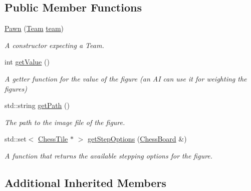 \subsection*{Public Member Functions}
\begin{DoxyCompactItemize}
\item 
\mbox{\label{classPawn_ab800634302e5af17a3d37cfe23f4cf15}} 
\mbox{\hyperlink{classPawn_ab800634302e5af17a3d37cfe23f4cf15}{Pawn}} (\mbox{\hyperlink{classChessFigure_a62f54318c1f28a08e6a6a2707f697a1d}{Team}} \mbox{\hyperlink{classChessFigure_ac7d0751a28c94d49927b9524390d1261}{team}})
\begin{DoxyCompactList}\small\item\em A constructor expecting a Team. \end{DoxyCompactList}\item 
\mbox{\label{classPawn_ab8d4325ff14660b70455c7b7acee221c}} 
int \mbox{\hyperlink{classPawn_ab8d4325ff14660b70455c7b7acee221c}{get\+Value}} ()
\begin{DoxyCompactList}\small\item\em A getter function for the value of the figure (an AI can use it for weighting the figures) \end{DoxyCompactList}\item 
\mbox{\label{classPawn_a72fd4d337ecea0e41f2ffb1933643269}} 
std\+::string \mbox{\hyperlink{classPawn_a72fd4d337ecea0e41f2ffb1933643269}{get\+Path}} ()
\begin{DoxyCompactList}\small\item\em The path to the image file of the figure. \end{DoxyCompactList}\item 
std\+::set$<$ \mbox{\hyperlink{classChessTile}{Chess\+Tile}} $\ast$ $>$ \mbox{\hyperlink{classPawn_aa05272b9dcf50914ca51c5be1fe2d014}{get\+Step\+Options}} (\mbox{\hyperlink{classChessBoard}{Chess\+Board}} \&)
\begin{DoxyCompactList}\small\item\em A function that returns the available stepping options for the figure. \end{DoxyCompactList}\end{DoxyCompactItemize}
\subsection*{Additional Inherited Members}


